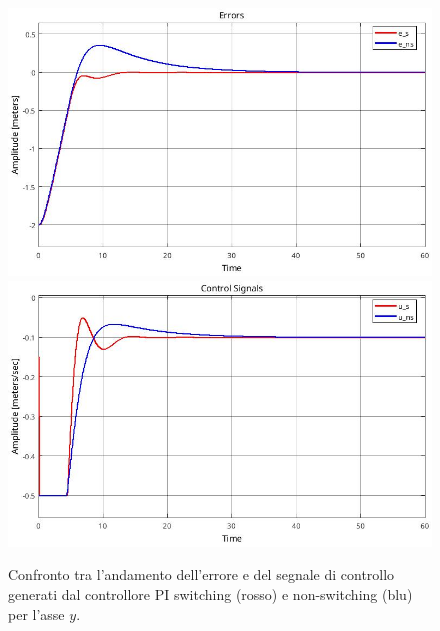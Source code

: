 \begin{figure}
    \centering
    \includegraphics[width=\textwidth]{figs/chapter4/yerrcomp.jpg}
    \vspace{0.2cm}
    \includegraphics[width=\textwidth]{figs/chapter4/ycontrolcomp.jpg}
    \caption{Confronto tra l'andamento dell'errore e del segnale di controllo generati dal controllore PI switching (rosso) e non-switching (blu) per l'asse $y$.}
    \label{fig:ycomp}
\end{figure}
\clearpage

